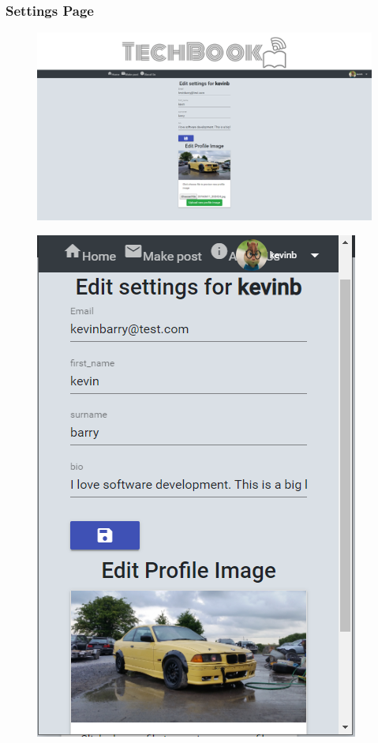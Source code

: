 \subsubsection{Settings Page}
\begin{figure}[H]
\centering
\begin{minipage}{.75\textwidth}
  \centering
  \includegraphics[width=.9\linewidth]{img/ui/settings_PC.PNG}
  \label{fig:settingsPC}
\end{minipage}%
\begin{minipage}{.25\textwidth}
  \centering
  \includegraphics[width=.9\linewidth]{img/ui/settings_MOBILE.PNG}
  \label{fig:settingsMOBILE}
\end{minipage}
\end{figure}

